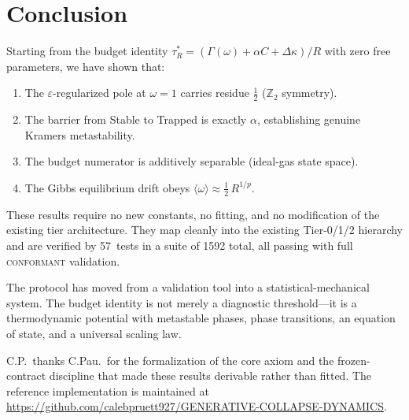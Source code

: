 \documentclass[
  aps,
  prd,
  twocolumn,
  showpacs,
  superscriptaddress,
  nofootinbib,
  floatfix
]{revtex4-2}
\newcommand{\tR}{\tau_{\!R}^{*}}
\newcommand{\Gam}{\Gamma}
\newcommand{\eps}{\varepsilon}
\begin{document}
\section{Conclusion}\label{sec:conclusion}

Starting from the budget identity $\tR = (\Gam(\omega)
+ \alpha C + \Delta\kappa)/R$ with zero free parameters,
we have shown that:
\begin{enumerate}
  \item The $\eps$-regularized pole at $\omega=1$ carries
        residue $\tfrac{1}{2}$ ($\mathbb{Z}_2$ symmetry).
  \item The barrier from Stable to Trapped is exactly $\alpha$,
        establishing genuine Kramers metastability.
  \item The budget numerator is additively separable (ideal-gas
        state space).
  \item The Gibbs equilibrium drift obeys
        $\langle\omega\rangle\approx\tfrac{1}{2}\,R^{1/p}$.
\end{enumerate}
These results require no new constants, no fitting, and no
modification of the existing tier architecture.  They map
cleanly into the existing Tier-0/1/2 hierarchy and are verified
by 57~tests in a suite of 1592 total, all passing with full
\textsc{conformant} validation.

The protocol has moved from a validation tool into a
statistical-mechanical system.  The budget identity is not
merely a diagnostic threshold---it is a thermodynamic potential
with metastable phases, phase transitions, an equation of state,
and a universal scaling law.

\begin{acknowledgments}
C.P.\ thanks C.Pau.\ for the formalization of the core axiom
and the frozen-contract discipline that made these results
derivable rather than fitted.
The reference implementation is maintained at
\url{https://github.com/calebpruett927/GENERATIVE-COLLAPSE-DYNAMICS}.
\end{acknowledgments}


\end{document}
